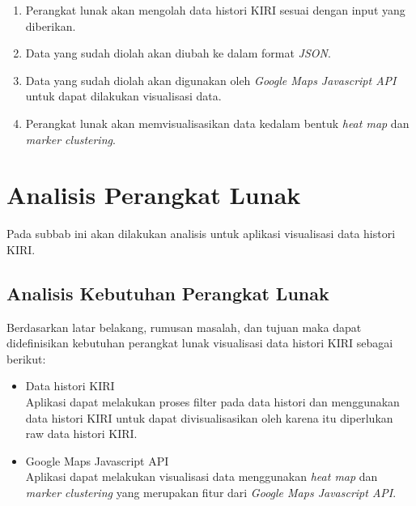 \begin{enumerate}
\item Perangkat lunak akan mengolah data histori KIRI sesuai dengan input yang diberikan.
\item Data yang sudah diolah  akan diubah ke dalam format \textit{JSON}.
\item Data yang sudah diolah akan digunakan oleh \textit{Google Maps Javascript API} untuk dapat dilakukan visualisasi data.
\item Perangkat lunak akan memvisualisasikan data kedalam bentuk \textit{heat map} dan \textit{marker clustering}.

\end{enumerate}


\section{Analisis Perangkat Lunak}
Pada subbab ini akan dilakukan analisis untuk aplikasi visualisasi data histori KIRI.
\subsection{Analisis Kebutuhan Perangkat Lunak}
\label{sec:analisisKebutuhanPerangkatLunak}
Berdasarkan latar belakang, rumusan masalah, dan tujuan maka dapat didefinisikan kebutuhan perangkat lunak visualisasi data histori KIRI sebagai berikut:
\begin{itemize}
    \item Data histori KIRI \\
    Aplikasi dapat melakukan proses filter pada data histori dan menggunakan data histori KIRI untuk dapat divisualisasikan oleh karena itu diperlukan raw data histori KIRI.
    
    \item Google Maps Javascript API \\
    Aplikasi dapat melakukan visualisasi data menggunakan \textit{heat map} dan \textit{marker clustering} yang merupakan fitur dari \textit{Google Maps Javascript API}.
    
\end{itemize}
